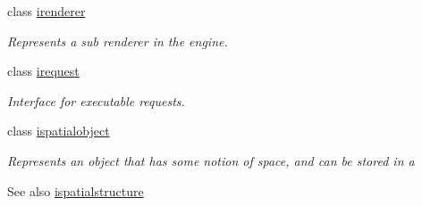 \begin{DoxyCompactItemize}
class \hyperlink{classflounder_1_1irenderer}{irenderer}
\begin{DoxyCompactList}\small\item\em Represents a sub renderer in the engine. \end{DoxyCompactList}\item 
class \hyperlink{classflounder_1_1irequest}{irequest}
\begin{DoxyCompactList}\small\item\em Interface for executable requests. \end{DoxyCompactList}\item 
class \hyperlink{classflounder_1_1ispatialobject}{ispatialobject}
\begin{DoxyCompactList}\small\item\em Represents an object that has some notion of space, and can be stored in a \begin{DoxySeeAlso}{See also}
\hyperlink{classflounder_1_1ispatialstructure}{ispatialstructure}



\end{DoxySeeAlso}
\end{DoxyCompactList}
\end{DoxyCompactItemize}
